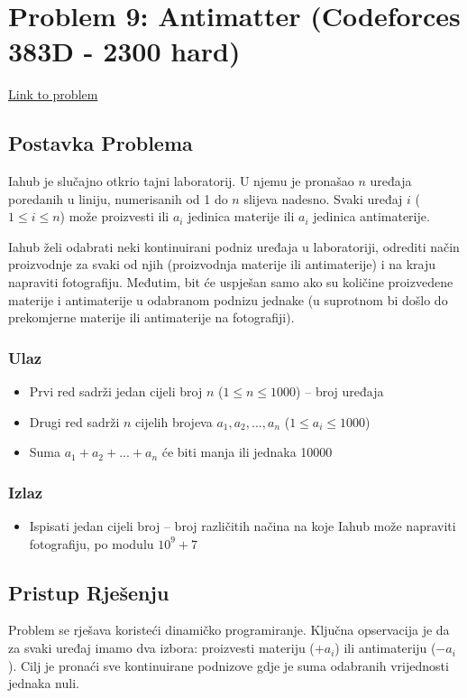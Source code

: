 \section{Problem 9: Antimatter (Codeforces 383D - 2300 hard)}
\href{https://codeforces.com/problemset/problem/383/D}{Link to problem}

\subsection{Postavka Problema}
Iahub je slučajno otkrio tajni laboratorij. U njemu je pronašao $n$ uređaja poredanih u liniju, numerisanih od 1 do $n$ slijeva nadesno. Svaki uređaj $i$ ($1 \leq i \leq n$) može proizvesti ili $a_i$ jedinica materije ili $a_i$ jedinica antimaterije.

Iahub želi odabrati neki kontinuirani podniz uređaja u laboratoriji, odrediti način proizvodnje za svaki od njih (proizvodnja materije ili antimaterije) i na kraju napraviti fotografiju. Međutim, bit će uspješan samo ako su količine proizvedene materije i antimaterije u odabranom podnizu jednake (u suprotnom bi došlo do prekomjerne materije ili antimaterije na fotografiji).

\subsubsection{Ulaz}
\begin{itemize}
    \item Prvi red sadrži jedan cijeli broj $n$ ($1 \leq n \leq 1000$) -- broj uređaja
    \item Drugi red sadrži $n$ cijelih brojeva $a_1, a_2, ..., a_n$ ($1 \leq a_i \leq 1000$)
    \item Suma $a_1 + a_2 + ... + a_n$ će biti manja ili jednaka 10000
\end{itemize}

\subsubsection{Izlaz}
\begin{itemize}
    \item Ispisati jedan cijeli broj -- broj različitih načina na koje Iahub može napraviti fotografiju, po modulu $10^9 + 7$
\end{itemize}

\subsection{Pristup Rješenju}
Problem se rješava koristeći dinamičko programiranje. Ključna opservacija je da za svaki uređaj imamo dva izbora: proizvesti materiju ($+a_i$) ili antimateriju ($-a_i$). Cilj je pronaći sve kontinuirane podnizove gdje je suma odabranih vrijednosti jednaka nuli.

